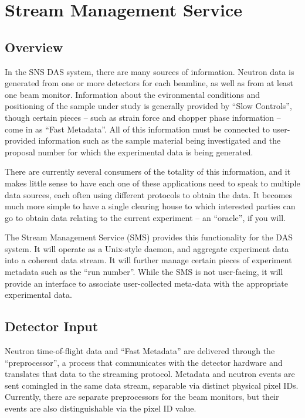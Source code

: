 \section{Stream Management Service}

\subsection{Overview}

In the SNS DAS system, there are many sources of information. Neutron data is
generated from one or more detectors for each beamline, as well as from at
least one beam monitor. Information about the evironmental conditions and
positioning of the sample under study is generally provided by ``Slow
Controls'', though certain pieces -- such as strain force and chopper phase
information -- come in as ``Fast Metadata''.  All of this information must be
connected to user-provided information such as the sample material being
investigated and the proposal number for which the experimental data is being
generated.

There are currently several consumers of the totality of this information, and
it makes little sense to have each one of these applications need to speak
to multiple data sources, each often using different protocols to obtain the
data. It becomes much more simple to have a single clearing house to which
interested parties can go to obtain data relating to the current experiment --
an ``oracle'', if you will.

The Stream Management Service (SMS) provides this functionality for the DAS
system. It will operate as a Unix-style daemon, and aggregate experiment data
into a coherent data stream. It will further manage certain pieces of
experiment metadata such as the ``run number''. While the SMS is not
user-facing, it will provide an interface to associate user-collected meta-data
with the appropriate experimental data.



\subsection{Detector Input}

Neutron time-of-flight data and ``Fast Metadata'' are delivered
through the ``preprocessor'', a process that communicates with the detector
hardware and translates that data to the streaming protocol. Metadata
and neutron events are sent comingled in the same data stream, separable
via distinct physical pixel IDs. Currently, there are separate preprocessors
for the beam monitors, but their events are also distinguishable via
the pixel ID value.

